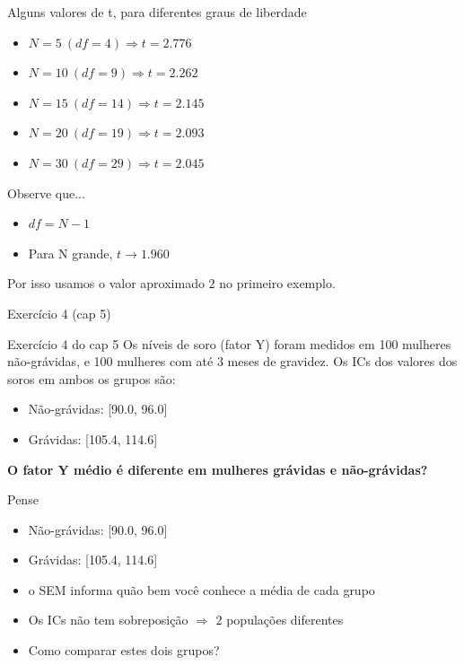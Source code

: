 \documentclass{beamer}
\begin{document}
\begin{frame}{Alguns valores de t, para diferentes graus de liberdade}
  \begin{itemize}
  \item $N = 5\ (df = 4) \Rightarrow t = 2.776$
  \item $N = 10\ (df = 9) \Rightarrow t = 2.262$
  \item $N = 15\ (df = 14) \Rightarrow t = 2.145$
  \item $N = 20\ (df = 19) \Rightarrow t = 2.093$
  \item $N = 30\ (df = 29) \Rightarrow t = 2.045$
  \end{itemize}
  \begin{block}{Observe que...}
    \begin{itemize}
    \item $df = N - 1$
    \item Para N  grande, $t \rightarrow 1.960$
    \end{itemize}
    Por isso usamos o valor aproximado $2$ no primeiro exemplo.
  \end{block}
\end{frame}

\begin{frame}{Exercício 4 (cap 5)}
  \begin{exampleblock}{Exercício 4 do cap 5}
    Os níveis de soro (fator Y) foram medidos em 100 mulheres não-grávidas, e 100 mulheres com até 3 meses de gravidez. Os ICs dos valores dos soros em ambos os grupos são:
    \begin{itemize}
    \item Não-grávidas: [90.0, 96.0]
    \item Grávidas: [105.4, 114.6]
    \end{itemize}

    \bigskip
    {\bf O fator Y médio é diferente em mulheres grávidas e não-grávidas?}
  \end{exampleblock}
\end{frame}

\begin{frame}{Pense}
  \begin{exampleblock}{}
    \begin{itemize}
    \item Não-grávidas: [90.0, 96.0]
    \item Grávidas: [105.4, 114.6]
    \end{itemize}
  \end{exampleblock}
  \begin{itemize}
  \item o SEM informa quão bem você conhece a média de cada grupo
  \item Os ICs não tem sobreposição $\Rightarrow$ 2 populações diferentes
  \item Como comparar estes dois grupos?
  \end{itemize}
\end{frame}
\end{document}

